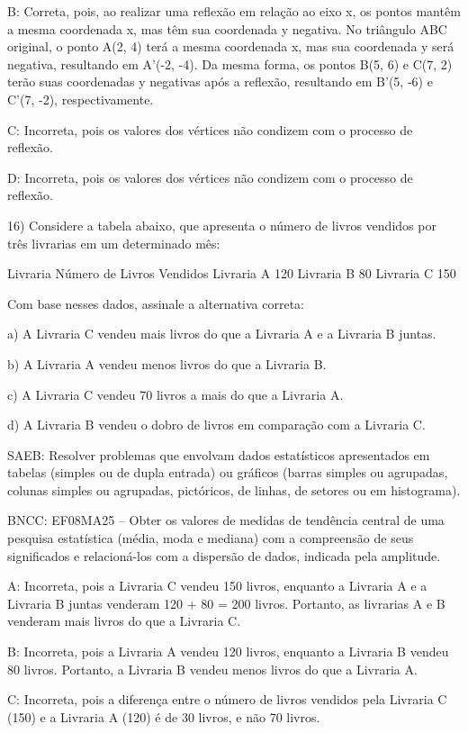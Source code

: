 B: Correta, pois, ao realizar uma reflexão em relação ao eixo x, os
pontos mantêm a mesma coordenada x, mas têm sua coordenada y negativa.
No triângulo ABC original, o ponto A(2, 4) terá a mesma coordenada x,
mas sua coordenada y será negativa, resultando em A'(-2, -4). Da mesma
forma, os pontos B(5, 6) e C(7, 2) terão suas coordenadas y negativas
após a reflexão, resultando em B'(5, -6) e C'(7, -2), respectivamente.

C: Incorreta, pois os valores dos vértices não condizem com o processo
de reflexão.

D: Incorreta, pois os valores dos vértices não condizem com o processo
de reflexão.

16) Considere a tabela abaixo, que apresenta o número de livros vendidos
por três livrarias em um determinado mês:


Livraria Número de Livros Vendidos Livraria A 120 Livraria B 80 Livraria
C 150

Com base nesses dados, assinale a alternativa correta:

a) A Livraria C vendeu mais livros do que a Livraria A e a Livraria B
juntas.

b) A Livraria A vendeu menos livros do que a Livraria B.

c) A Livraria C vendeu 70 livros a mais do que a Livraria A.

d) A Livraria B vendeu o dobro de livros em comparação com a Livraria C.

SAEB: Resolver problemas que envolvam dados estatísticos apresentados em
tabelas (simples ou de dupla entrada) ou gráficos (barras simples ou
agrupadas, colunas simples ou agrupadas, pictóricos, de linhas, de
setores ou em histograma).

BNCC: EF08MA25 -- Obter os valores de medidas de tendência central de
uma pesquisa estatística (média, moda e mediana) com a compreensão de
seus significados e relacioná-los com a dispersão de dados, indicada
pela amplitude.

A: Incorreta, pois a Livraria C vendeu 150 livros, enquanto a Livraria A
e a Livraria B juntas venderam 120 + 80 = 200 livros. Portanto, as
livrarias A e B venderam mais livros do que a Livraria C.

B: Incorreta, pois a Livraria A vendeu 120 livros, enquanto a Livraria B
vendeu 80 livros. Portanto, a Livraria B vendeu menos livros do que a
Livraria A.

C: Incorreta, pois a diferença entre o número de livros vendidos pela
Livraria C (150) e a Livraria A (120) é de 30 livros, e não 70 livros.

